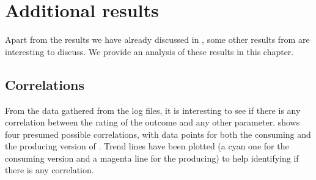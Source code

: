 \chapter{Additional results}

Apart from the results we have already discussed in , some other results from  are interesting to discuss. We provide an analysis of these results in this chapter.



\section{Correlations}
From the data gathered from the log files, it is interesting to see if there is any correlation between the rating of the outcome and any other parameter.  shows four presumed possible correlations, with data points for both the consuming and the producing version of \oframp. Trend lines have been plotted (a cyan one for the consuming version and a magenta line for the producing) to help identifying if there is any correlation.

